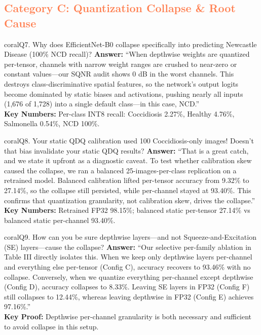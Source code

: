 \documentclass[10pt,a4paper]{article}
\begin{document}
\subsection*{\textcolor{coral}{Category C: Quantization Collapse \& Root Cause}}

\begin{qabox}{coral}{Q7. Why does EfficientNet-B0 collapse specifically into predicting Newcastle Disease (100\% NCD recall)?}
\textbf{Answer:}
``When depthwise weights are quantized per-tensor, channels with narrow weight ranges are crushed to near-zero or constant values---our SQNR audit shows 0 dB in the worst channels. This destroys class-discriminative spatial features, so the network's output logits become dominated by static biases and activations, pushing nearly all inputs (1,676 of 1,728) into a single default class---in this case, NCD.''\\[3pt]
\textbf{Key Numbers:} Per-class INT8 recall: Coccidiosis 2.27\%, Healthy 4.76\%, Salmonella 0.54\%, NCD 100\%.
\end{qabox}

\begin{qabox}{coral}{Q8. Your static QDQ calibration used 100 Coccidiosis-only images! Doesn't that bias invalidate your static QDQ results?}
\textbf{Answer:}
``That is a great catch, and we state it upfront as a diagnostic caveat. To test whether calibration skew caused the collapse, we ran a balanced 25-images-per-class replication on a retrained model. Balanced calibration lifted per-tensor accuracy from 9.32\% to 27.14\%, so the collapse still persisted, while per-channel stayed at 93.40\%. This confirms that quantization granularity, not calibration skew, drives the collapse.''\\[3pt]
\textbf{Key Numbers:} Retrained FP32 98.15\%; balanced static per-tensor 27.14\% vs balanced static per-channel 93.40\%.
\end{qabox}

\begin{qabox}{coral}{Q9. How can you be sure depthwise layers---and not Squeeze-and-Excitation (SE) layers---cause the collapse?}
\textbf{Answer:}
``Our selective per-family ablation in Table III directly isolates this. When we keep only depthwise layers per-channel and everything else per-tensor (Config C), accuracy recovers to 93.46\% with no collapse. Conversely, when we quantize everything per-channel except depthwise (Config D), accuracy collapses to 8.33\%. Leaving SE layers in FP32 (Config F) still collapses to 12.44\%, whereas leaving depthwise in FP32 (Config E) achieves 97.16\%.''\\[3pt]
\textbf{Key Proof:} Depthwise per-channel granularity is both necessary and sufficient to avoid collapse in this setup.
\end{qabox}
\end{document}
